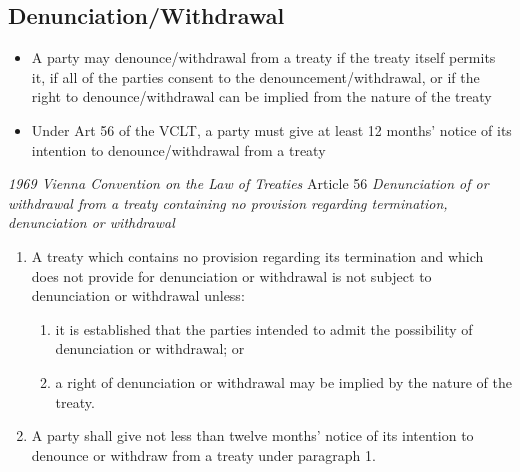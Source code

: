 \subsection{Denunciation/Withdrawal}
\begin{itemize}
    \item A party may denounce/withdrawal from a treaty if the treaty itself permits it, if all of the parties consent to the denouncement/withdrawal, or if the right to denounce/withdrawal can be implied from the nature of the treaty
    \item Under Art 56 of the VCLT, a party must give at least 12 months' notice of its intention to denounce/withdrawal from a treaty
\end{itemize}
\begin{conventiondetails}{\textit{1969 Vienna Convention on the Law of Treaties} Article 56}
    \flushleft
    \textit{Denunciation of or withdrawal from a treaty containing no provision regarding termination, denunciation or withdrawal}

    \begin{enumerate}
        \item A treaty which contains no provision regarding its termination and which does not provide for denunciation or withdrawal is not subject to denunciation or withdrawal unless:
        \begin{enumerate}[label=(\alph*)]
            \item it is established that the parties intended to admit the possibility of denunciation or withdrawal; or 
            \item a right of denunciation or withdrawal may be implied by the nature of the treaty.
        \end{enumerate}
        \item A party shall give not less than twelve months' notice of its intention to denounce or withdraw from a treaty under paragraph 1.
    \end{enumerate}
\end{conventiondetails}

